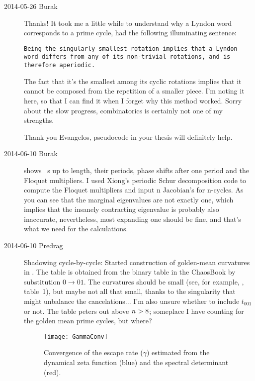 \begin{description}
\item[2014-05-26 Burak] Thanks! It took me a little while to understand
why a Lyndon word corresponds to a prime cycle,
had the following illuminating sentence:

\texttt{Being the singularly smallest rotation implies that a Lyndon word
differs from any of its non-trivial rotations, and is therefore aperiodic.}

The fact that it's the smallest among its cyclic rotations implies that
it cannot be composed from the repetition of a smaller piece. I'm noting
it here, so that I can find it when I forget why this method worked. Sorry
about the slow progress, combinatorics is certainly not one of my strengths.

Thank you Evangelos, pseudocode in your thesis will definitely help.

\item[2014-06-10 Burak]  shows \twomode\ \rpo s
up to length, their periods, phase shifts after one period and the
Floquet multipliers. I used Xiong's periodic Schur
decomposition code to compute the Floquet
multipliers and input n Jacobian's for n-cycles. As you can see that the
marginal eigenvalues are not exactly one, which implies that the insanely
contracting eigenvalue is probably also inaccurate, nevertheless, most
expanding one should be fine, and that's what we need for the
calculations.



\item[2014-06-10 Predrag]                                   \toCB
Shadowing cycle-by-cycle: Started construction of golden-mean curvatures
in . The table is obtained from the binary table in the
{ChaosBook} by substitution $0\to01$. The curvatures should be small
 (see, for
example, , table~1), but maybe not all that small, thanks
to the singularity that might unbalance the cancelations... I'm also
unsure whether to include $t_{001}$ or not. The table peters out above
${n_{}}>8$; someplace I have counting for the golden mean prime cycles, but where?



\begin{figure}%
  \begin{center}
   \texttt{[image: GammaConv]}
  \end{center}
  \caption{Convergence of the escape rate ($\gamma$) estimated from the dynamical 
  zeta function (blue) and the spectral determinant (red).
    }
  \label{f-GammaConv}
\end{figure}


\end{description}
